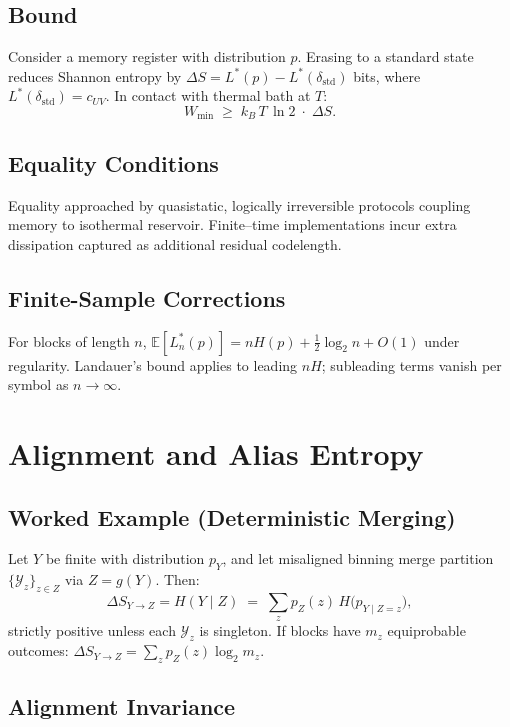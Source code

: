 \documentclass[11pt,letterpaper]{article}
\theoremstyle{definition}
\theoremstyle{remark}
\begin{document}
\subsection{Bound}

Consider a memory register with distribution \(p\). Erasing to a standard state reduces Shannon entropy by \(\Delta S=L^\ast(p)-L^\ast(\delta_{\text{std}})\) bits, where \(L^\ast(\delta_{\text{std}})=c_{UV}\). In contact with thermal bath at \(T\):
\[
W_{\min} \;\ge\; k_B\,T\,\ln 2 \;\cdot\; \Delta S.
\]

\subsection{Equality Conditions}

Equality approached by quasistatic, logically irreversible protocols coupling memory to isothermal reservoir. Finite--time implementations incur extra dissipation captured as additional residual codelength.

\subsection{Finite-Sample Corrections}

For blocks of length \(n\), \(\mathbb{E}[L^\ast_n(p)] = nH(p) + \tfrac12 \log_2 n + O(1)\) under regularity. Landauer's bound applies to leading \(nH\); subleading terms vanish per symbol as \(n\to\infty\).

\section{Alignment and Alias Entropy}\label{app:alignment}

\subsection{Worked Example (Deterministic Merging)}

Let \(Y\) be finite with distribution \(p_Y\), and let misaligned binning merge partition \(\{\mathcal{Y}_z\}_{z\in Z}\) via \(Z=g(Y)\). Then:
\[
\Delta S_{Y\to Z}=H(Y\mid Z) \;=\; \sum_{z} p_Z(z)\, H\!\big(p_{Y\mid Z=\!z}\big),
\]
strictly positive unless each \(\mathcal{Y}_z\) is singleton. If blocks have \(m_z\) equiprobable outcomes: \(\Delta S_{Y\to Z}=\sum_z p_Z(z)\log_2 m_z\).

\subsection{Alignment Invariance}
\end{document}
